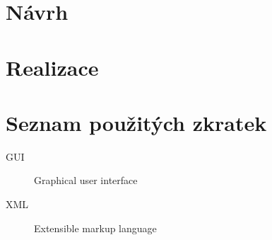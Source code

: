 \documentclass[thesis=B,english]{FITthesis}[2012/06/26]
\begin{document}
\chapter{Návrh}

\chapter{Realizace}

\begin{conclusion}
\end{conclusion}




\appendix

\chapter{Seznam použitých zkratek}
\begin{description}
	\item[GUI] Graphical user interface
	\item[XML] Extensible markup language
\end{description}
\end{document}
